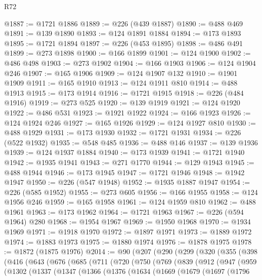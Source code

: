 \begin{lexlean}{R72}
\begin{coremodule}
@1887 := @1721 @1886
@1889 := @226 (@439 @1887)
@1890 := @488 @469
@1891 := @139 @1890
@1893 := @124 @1891 @1884
@1894 := @173 @1893
@1895 := @1721 @1894
@1897 := @226 (@453 @1895)
@1898 := @486 @491
@1899 := @273 @1898
@1900 := @166 @1899
@1901 := @124 @1900
@1902 := @486 @498
@1903 := @273 @1902
@1904 := @166 @1903
@1906 := @124 @1904 @246
@1907 := @165 @1906
@1909 := @124 @1907 @132
@1910 := @1901 @1909
@1911 := @165 @1910
@1913 := @124 @1911 @810
@1914 := @488 @1913
@1915 := @173 @1914
@1916 := @1721 @1915
@1918 := @226 (@484 @1916)
@1919 := @273 @525
@1920 := @139 @1919
@1921 := @124 @1920
@1922 := @486 @531
@1923 := @1921 @1922
@1924 := @166 @1923
@1926 := @124 @1924 @246
@1927 := @165 @1926
@1929 := @124 @1927 @810
@1930 := @488 @1929
@1931 := @173 @1930
@1932 := @1721 @1931
@1934 := @226 (@522 @1932)
@1935 := @548 @485
@1936 := @488 @146
@1937 := @139 @1936
@1939 := @124 @1937 @1884
@1940 := @173 @1939
@1941 := @1721 @1940
@1942 := @1935 @1941
@1943 := @271 @1770
@1944 := @129 @1943
@1945 := @488 @1944
@1946 := @173 @1945
@1947 := @1721 @1946
@1948 := @1942 @1947
@1950 := @226 (@547 @1948)
@1952 := @1935 @1887 @1947
@1954 := @226 (@585 @1952)
@1955 := @273 @605
@1956 := @166 @1955
@1958 := @124 @1956 @246
@1959 := @165 @1958
@1961 := @124 @1959 @810
@1962 := @488 @1961
@1963 := @173 @1962
@1964 := @1721 @1963
@1967 := @226 (@594 @1964) @280
@1968 := @1954 @1967
@1969 := @1950 @1968
@1970 := @1934 @1969
@1971 := @1918 @1970
@1972 := @1897 @1971
@1973 := @1889 @1972
@1974 := @1883 @1973
@1975 := @1880 @1974
@1976 := @1878 @1975
@1978 := @1872 (@1875 @1976)
@2014 := @90
    (@207
      (@290
        (@299
          (@320
            (@355
              (@398
                (@416
                  (@643
                    (@676
                      (@685
                        (@711
                          (@720
                            (@750
                              (@769
                                (@839
                                  (@912
                                    (@947
                                      (@959
                                        (@1302
                                          (@1337
                                            (@1347
                                              (@1366
                                                (@1376
                                                  (@1634
                                                    (@1669
                                                      (@1679
                                                        (@1697
                                                          (@1796

\end{coremodule}
\end{lexlean}
